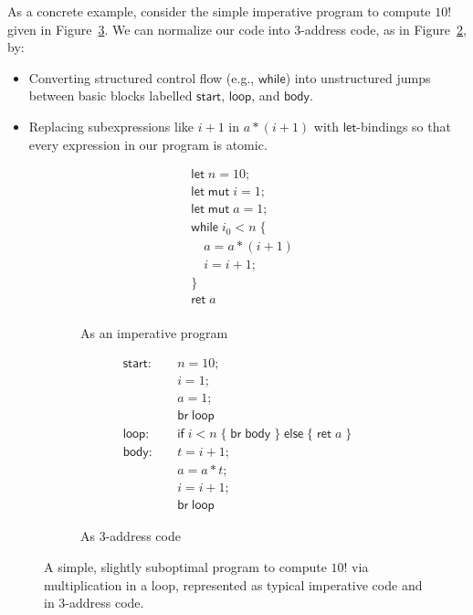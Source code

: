 \documentclass[acmsmall,screen,review]{acmart}
\newcommand{\ms}[1]{\ensuremath{\mathsf{#1}}}
\begin{document}
As a concrete example, consider the simple imperative program to compute $10!$ given in
Figure~\ref{fig:fact-program}. We can normalize our code into 3-address code, as in
Figure~\ref{fig:fact-3addr}, by:
\begin{itemize}
  \item Converting structured control flow (e.g., \ms{while}) into unstructured jumps between basic
  blocks labelled \ms{start}, \ms{loop}, and \ms{body}.
  \item Replacing subexpressions like $i + 1$ in $a * (i + 1)$ with \ms{let}-bindings so that every
  expression in our program is atomic.
\end{itemize}

\begin{figure}
  \begin{subfigure}[t]{.5\textwidth}
    \begin{align*}
      & \ms{let}\;n = 10; \\
      & \ms{let\;mut}\;i = 1; \\
      & \ms{let\;mut}\;a = 1; \\
      & \ms{while}\;i_0 < n\;\{ \\
      & \quad a = a * (i + 1) \\
      & \quad i = i + 1; \\
      & \} \\
      & \ms{ret}\;a \\
    \end{align*}
    \caption{As an imperative program}
    \label{fig:fact-imp}
  \end{subfigure}%
  \begin{subfigure}[t]{.5\textwidth}
    \begin{align*}
      \ms{start}:\quad  & n = 10; \\
                        & i = 1; \\
                        & a = 1; \\
                        & \ms{br}\;\ms{loop} \\
      \ms{loop}: \quad  & \ms{if}\;i < n\;
                          \{\;\ms{br}\;\ms{body}\;\}\;
                          \ms{else}\;\{\;\ms{ret}\;a\;\} \\
      \ms{body}: \quad  & t = i + 1; \\
                        & a = a * t; \\
                        & i = i + 1; \\
                        & \ms{br}\;\ms{loop}
    \end{align*}
    \caption{As 3-address code}
    \label{fig:fact-3addr}
  \end{subfigure}
  \caption{
    A simple, slightly suboptimal program to compute $10!$ via multiplication in a loop, represented
    as typical imperative code and in 3-address code.
  }
  \Description{}
  \label{fig:fact-program}
\end{figure}
\end{document}
